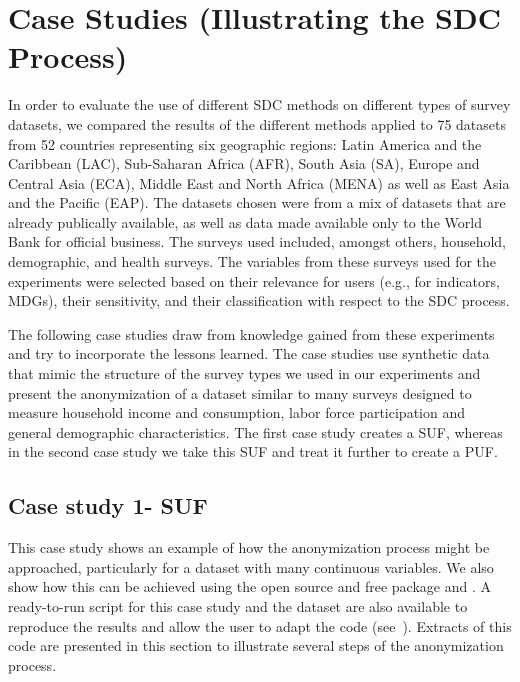 \documentclass[letterpaper,10pt,english]{sphinxmanual}
\begin{document}
\chapter{Case Studies (Illustrating the SDC Process)}
\label{\detokenize{case_studies:case-studies-illustrating-the-sdc-process}}\label{\detokenize{case_studies::doc}}
In order to evaluate the use of different SDC methods on different types
of survey datasets, we compared the results of the different methods
applied to 75 datasets from 52 countries representing six geographic
regions: Latin America and the Caribbean (LAC), Sub-Saharan Africa
(AFR), South Asia (SA), Europe and Central Asia (ECA), Middle East and
North Africa (MENA) as well as East Asia and the Pacific (EAP). The
datasets chosen were from a mix of datasets that are already publically
available, as well as data made available only to the World Bank for
official business. The surveys used included, amongst others, household,
demographic, and health surveys. The variables from these surveys used
for the experiments were selected based on their relevance for users
(e.g., for indicators, MDGs), their sensitivity, and their classification
with respect to the SDC process.

The following case studies draw from knowledge gained from these
experiments and try to incorporate the lessons learned. The case studies
use synthetic data that mimic the structure of the survey types we used
in our experiments and present the anonymization of a dataset similar to
many surveys designed to measure household income and consumption, labor
force participation and general demographic characteristics. The first
case study creates a SUF, whereas in the second case study we take this
SUF and treat it further to create a PUF.


\section{Case study 1- SUF}
\label{\detokenize{case_studies:case-study-1-suf}}
This case study shows an example of how the anonymization process might
be approached, particularly for a dataset with many continuous
variables. We also show how this can be achieved using the open source
and free  package and . A ready-to-run  script for this
case study and the dataset are also available to reproduce the results
and allow the user to adapt the code
(see ). Extracts of this code
are presented in this section to illustrate several steps of the anonymization process.
\end{document}
